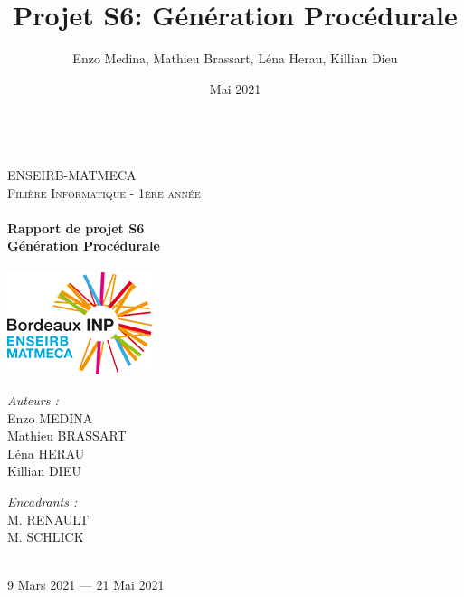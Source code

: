 \documentclass[a4paper]{article}
\title{Projet S6: Génération Procédurale}
\author{Enzo Medina, Mathieu Brassart, Léna Herau, Killian Dieu}
\date{Mai 2021}
\begin{document}
\begin{titlepage}
    \begin{sffamily}
    \begin{center}
    
    ~\\[1.5cm]
    \textsc{\LARGE ENSEIRB-MATMECA}\\[1.5cm]
    
    \textsc{\Large Filière Informatique - 1ère année}\\[2cm]
    
    
        \hrulefill \\[0.4cm]
    { \Huge \bfseries Rapport de projet S6 \\[0.4cm] }
    { \huge \bfseries Génération Procédurale \\[0.4cm] }
     \hrulefill \\[2cm]
     
     \includegraphics[width=0.4\columnwidth]{logo-em.png} \\[1cm]
     
    \begin{minipage}{0.4\textwidth}
      \begin{flushleft} \large
         \emph{Auteurs :} \\
        Enzo MEDINA\\
        Mathieu BRASSART \\
        Léna HERAU \\
        Killian DIEU \\
      \end{flushleft}
    \end{minipage}
    \begin{minipage}{0.4\textwidth}
      \begin{flushright} \large
        \emph{Encadrants :} \\
        M. RENAULT\\
        M. SCHLICK \\
      \end{flushright}
    \end{minipage}
    
     ~\\[1.5cm]
    {\large 9 Mars 2021 — 21 Mai 2021}
    
    \end{center}
    \end{sffamily}
\end{titlepage}
\end{document}
